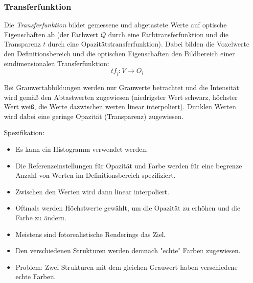 			\subsubsection{Transferfunktion}
				Die \emph{Transferfunktion} bildet gemessene und abgetastete Werte auf optische Eigenschaften ab (der Farbwert \(Q\) durch eine Farbtransferfunktion und die Transparenz \(t\) durch eine Opazitätstransferfunktion). Dabei bilden die Voxelwerte den Definitionsbereich und die optischen Eigenschaften den Bildbereich einer eindimensionalen Transferfunktion:
				\begin{equation*}
					\textit{tf}_i : V \to O_i
				\end{equation*}
				
				Bei Grauwertabbildungen werden nur Grauwerte betrachtet und die Intensität wird gemäß den Abtastwerten zugewiesen (niedrigster Wert schwarz, höchster Wert weiß, die Werte dazwischen werten linear interpoliert). Dunklen Werten wird dabei eine geringe Opazität (Transparenz) zugewiesen.
				
				Spezifikation:
				\begin{itemize}
					\item Es kann \zB ein Histogramm verwendet werden.
					\item Die Referenzeinstellungen für Opazität und Farbe werden für eine begrenze Anzahl von Werten im Definitionsbereich spezifiziert.
					\item Zwischen den Werten wird dann linear interpoliert.
					\item Oftmals werden Höchstwerte gewählt, um die Opazität zu erhöhen und die Farbe zu ändern.
					\item Meistens sind fotorealistische Renderings das Ziel.
					\item Den verschiedenen Strukturen werden demnach "echte" Farben zugewiesen.
					\item Problem: Zwei Strukturen mit dem gleichen Grauwert haben \mglw verschiedene echte Farben.
				\end{itemize}

